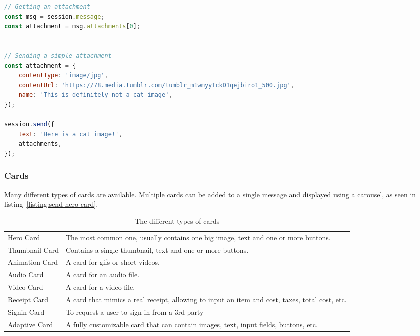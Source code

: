 \begin{lstlisting}[language=JavaScript,caption=Receiving an attachment from the user and sending an image,label=listing:receive-attachment]
// Getting an attachment
const msg = session.message;
const attachment = msg.attachments[0];


// Sending a simple attachment
const attachment = {
	contentType: 'image/jpg',
	contentUrl: 'https://78.media.tumblr.com/tumblr_m1wmyyTckD1qejbiro1_500.jpg',
	name: 'This is definitely not a cat image',
});

session.send({
	text: 'Here is a cat image!',
	attachments,
});
\end{lstlisting}

\subsubsection{Cards}

Many different types of cards are available. Multiple cards can be added to a single message and displayed using a carousel, as seen in listing~\ref{listing:send-hero-card}.

\renewcommand{\arraystretch}{2}
\begin{table}[h]
	\centering
	\begin{tabular}{p{} |p{}}
		Hero Card      & The most common one, usually contains one big image, text and one or more buttons.             \\
		Thumbnail Card & Contains a single thumbnail, text and one or more buttons.                                     \\
		Animation Card & A card for gifs or short videos.                                                               \\
		Audio Card     & A card for an audio file.                                                                      \\
		Video Card     & A card for a video file.                                                                       \\
		Receipt Card   & A card that mimics a real receipt, allowing to input an item and cost, taxes, total cost, etc. \\
		Signin Card    & To request a user to sign in from a 3rd party                                                  \\
		Adaptive Card  & A fully customizable card that can contain images, text, input fields, buttons, etc.           \\
	\end{tabular}
	\caption{The different types of cards}
	\label{tab:card-types}
\end{table}

